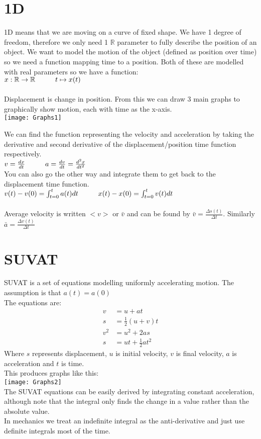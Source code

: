 \documentclass[class=article, crop=false]{standalone}
\begin{document}
\section*{1D}
1D means that we are moving on a curve of fixed shape. We have 1 degree of freedom, therefore we only need 1 $\mathbb{R}$ parameter to fully describe the position of an object. We want to model the motion of the object (defined as position over time) so we need a function mapping time to a position. Both of these are modelled with real parameters so we have a function: \\
$x: \mathbb{R} \to \mathbb{R} \hspace*{1cm} t \mapsto x(t)$ \\\\

Displacement is change in position. From this we can draw 3 main graphs to graphically show motion, each with time as the x-axis. \\
\texttt{[image: Graphs1]}

We can find the function representing the velocity and acceleration by taking the derivative and second derivative of the displacement/position time function respectively. \\
$v = \frac{dx}{dt} \hspace*{1cm} a = \frac{dv}{dt} = \frac{d^2x}{dt^2}$ \\
You can also go the other way and integrate them to get back to the displacement time function. \\
$v(t) - v(0)= \int_{t=0}^t a(t) dt \hspace*{1cm} x(t) - x(0) = \int_{t=0}^t v(t) dt$ \\\\

Average velocity is written $<v>$ or $\bar{v}$ and can be found by $\bar{v} = \frac{\Delta s(t)}{\Delta t}$. Similarly $\bar{a} = \frac{\Delta v(t)}{\Delta t}$ \\

\section*{SUVAT}
SUVAT is a set of equations modelling uniformly accelerating motion. The assumption is that $a(t) = a(0)$\\
The equations are:
\begin{align}
v & = u + at \\
s & = \frac{1}{2}(u + v)t \\
v^2 & = u^2 + 2as \\
s & = ut + \frac{1}{2}at^2 
\end{align}
Where $s$ represents displacement, $u$ is initial velocity, $v$ is final velocity, $a$ is acceleration and $t$ is time. \\
This produces graphs like this: \\
\texttt{[image: Graphs2]} \\
The SUVAT equations can be easily derived by integrating constant acceleration, although note that the integral only finds the change in a value rather than the absolute value. \\
In mechanics we treat an indefinite integral as the anti-derivative and just use definite integrals most of the time. 
\end{document}

